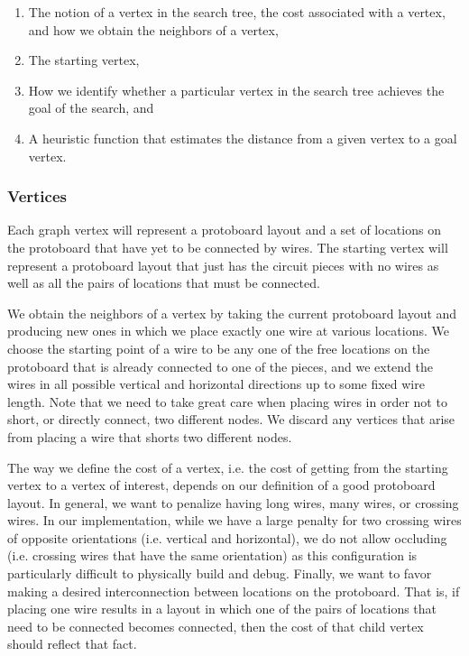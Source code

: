 \begin{enumerate}
\item The notion of a vertex in the
search tree, the cost associated with a vertex, and how we obtain the neighbors
of a vertex,
\item The starting vertex,
\item How we identify whether a particular vertex in the search tree achieves
the goal of the search, and
\item A heuristic function that estimates the distance from a given vertex to a
goal vertex.
\end{enumerate}

\subsubsection{Vertices}

Each graph vertex will represent a protoboard layout and a set of locations on
the protoboard that have yet to be connected by wires. The starting vertex will
represent a protoboard layout that just has the circuit pieces with no
wires as well as all the pairs of locations that must be connected.

We obtain the neighbors of a vertex by taking the current protoboard layout and
producing new ones in which we place exactly one wire at various locations. We
choose the starting point of a wire to be any one of the free locations on the
protoboard that is already connected to one of the pieces, and we extend the
wires in all possible vertical and horizontal directions up to some fixed wire
length. Note that we need
to take great care when placing wires in order not to short, or directly connect,
two different nodes. We
discard any vertices that arise from placing a wire that shorts two different
nodes.

The way we define the cost of a vertex, i.e. the cost of getting from the
starting vertex to a vertex of interest, depends on our definition of a good
protoboard layout. In general, we want to penalize having
long wires, many wires, or crossing wires. In our implementation, while we have
a large penalty for two crossing wires of opposite orientations (i.e. vertical
and horizontal), we do not allow occluding (i.e. crossing wires that have the
same orientation) as
this configuration is particularly difficult to physically build and debug.
Finally, we want to favor making a desired interconnection between locations
on the protoboard. That is, if placing one wire results in a layout in which
one of the pairs of locations that need to be connected becomes connected, then
the cost of that child vertex should reflect that fact.

